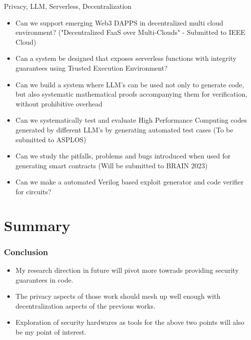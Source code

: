 \documentclass[10pt,aspectratio=169]{beamer}
\begin{document}
\begin{frame}[fragile]{Privacy, LLM, Serverless, Decentralization}

 \begin{itemize}
\item Can we support emerging Web3 DAPPS in decentralized multi cloud environment? 
("Decentralized FaaS over Multi-Clouds" - Submitted to IEEE Cloud)
\item Can a system be designed that exposes serverless functions with integrity guarantees using Trusted Execution Environment?
\item Can we build a system where LLM's can be used not only to generate code, but also systematic mathematical proofs accompanying them for verification, without prohibitive overhead
\item Can we systematically test and evaluate High Performance Computing codes generated by different LLM's by generating automated test cases (To be submitted to ASPLOS)
\item Can we study the pitfalls, problems and bugs introduced when used for generating smart contracts (Will be submitted to BRAIN 2023)
\item Can we make a automated Verilog based exploit generator and code verifier for circuits?
\end{itemize}
\end{frame}


\section{Summary}

\begin{frame}
\frametitle{Conclusion}
\begin{itemize}
\item  My research direction in future will pivot more towrads providing security guarantees in code.
\item The privacy aspects of those work should mesh up well enough with decentralization aspects of the previous works.
\item Exploration of security hardwares as tools for the above two points will also be my point of interest.
\end{itemize}
\end{frame}

\end{document}
